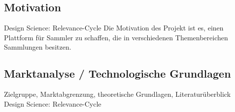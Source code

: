 \subsection{Motivation}\label{subsec:Motivation}
Design Science: Relevance-Cycle
Die Motivation des Projekt ist es, einen Plattform für Sammler zu schaffen, die in verschiedenen Themenbereichen Sammlungen besitzen.


\subsection{Marktanalyse / Technologische Grundlagen}\label{subsec:Marktanalyse-TechnologischeGrundlagen}
Zielgruppe, Marktabgrenzung, theoretische Grundlagen, Literaturüberblick\linebreak
Design Science: Relevance-Cycle